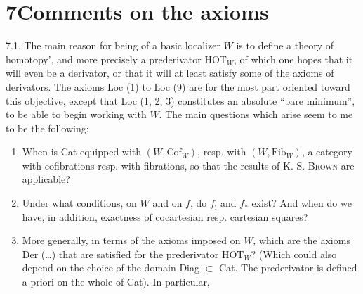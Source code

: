 \documentclass[11pt]{article}
\newcommand{\msp}[1]{\marginpar{\footnotesize [#1]}}
\begin{document}
\msp{page 97}

\section*{7\quad Comments on the axioms}

7.1. The main reason for being of a basic localizer $W$ is to define a theory of homotopy’, and more precisely a prederivator $\mathrm{HOT}_W$, of which one hopes that it will even be a derivator, or that it will at least satisfy some of the axioms of derivators. The axioms Loc (1) to Loc (9) are for the most part oriented toward this objective, except that Loc (1, 2, 3) constitutes an absolute ``bare minimum'', to be able to begin working with $W$. The main questions which arise seem to me to be the following: %
\begin{enumerate}[label={}, leftmargin=2.5em]
\item[1)] When is Cat equipped with $(W, \mathrm{Cof}_W)$, resp. with $(W, \mathrm{Fib}_W)$, a category with cofibrations resp. with fibrations, so that the results of K. S. \textsc{Brown} are applicable?
\item[2)] Under what conditions, on $W$ and on $f$, do $f_!$ and $f_*$ exist? And when do we have, in addition, exactness of cocartesian resp. cartesian squares?

\msp{page 98}
\item[3)] More generally, in terms of the axioms imposed on $W$, which are the axioms Der (\ldots) that are satisfied for the prederivator $\mathrm{HOT}_W$? (Which could also depend on the choice of the domain Diag $\subset$ Cat. The prederivator is defined a priori on the whole of Cat). In particular, %
\end{enumerate}
\end{document}
